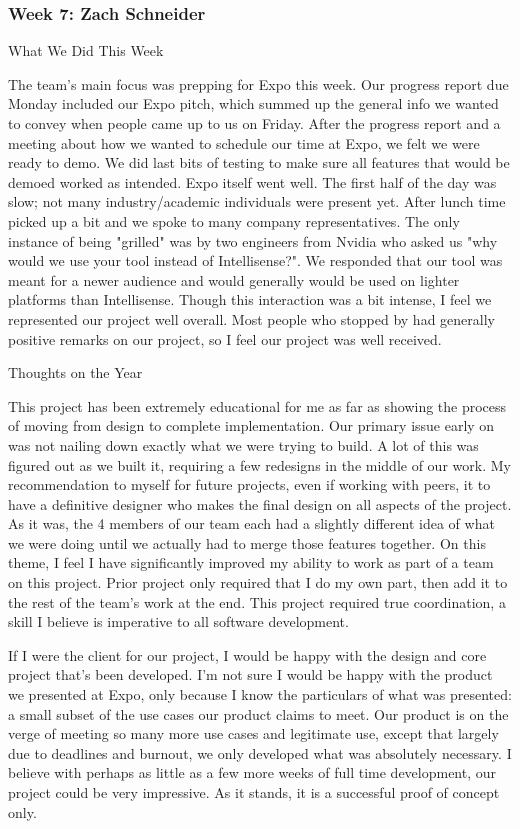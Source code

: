  \subsubsection{Week 7: Zach Schneider}

What We Did This Week

The team's main focus was prepping for Expo this week. Our progress report due Monday included our Expo pitch, which summed up the general info we wanted to convey when people came up to us on Friday. After the progress report and a meeting about how we wanted to schedule our time at Expo, we felt we were ready to demo. We did last bits of testing to make sure all features that would be demoed worked as intended. Expo itself went well. The first half of the day was slow; not many industry/academic individuals were present yet. After lunch time picked up a bit and we spoke to many company representatives. The only instance of being "grilled" was by two engineers from Nvidia who asked us "why would we use your tool instead of Intellisense?". We responded that our tool was meant for a newer audience and would generally would be used on lighter platforms than Intellisense. Though this interaction was a bit intense, I feel we represented our project well overall. Most people who stopped by had generally positive remarks on our project, so I feel our project was well received.



Thoughts on the Year

This project has been extremely educational for me as far as showing the process of moving from design to complete implementation. Our primary issue early on was not nailing down exactly what we were trying to build. A lot of this was figured out as we built it, requiring a few redesigns in the middle of our work. My recommendation to myself for future projects, even if working with peers, it to have a definitive designer who makes the final design on all aspects of the project. As it was, the 4 members of our team each had a slightly different idea of what we were doing until we actually had to merge those features together. On this theme, I feel I have significantly improved my ability to work as part of a team on this project. Prior project only required that I do my own part, then add it to the rest of the team's work at the end. This project required true coordination, a skill I believe is imperative to all software development.



If I were the client for our project, I would be happy with the design and core project that's been developed. I'm not sure I would be happy with the product we presented at Expo, only because I know the particulars of what was presented: a small subset of the use cases our product claims to meet. Our product is on the verge of meeting so many more use cases and legitimate use, except that largely due to deadlines and burnout, we only developed what was absolutely necessary. I believe with perhaps as little as a few more weeks of full time development, our project could be very impressive. As it stands, it is a successful proof of concept only. 




